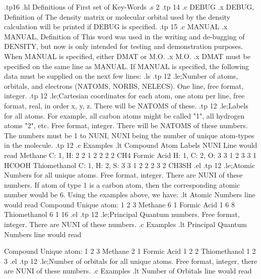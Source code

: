 .tp16
.hl Definitions of First set of Key-Words
.s 2
.tp 14
.c
DEBUG
.x DEBUG, Definition of
 The density matrix or molecular orbital used by the density calculation
will be printed if DEBUG is specified.
.tp 15
.c
 MANUAL
.x MANUAL, Definition of
 This word was used in the writing and de-bugging of DENSITY, 
but now is only intended for testing and demonstration purposes. 
  When MANUAL is specified, either DMAT or M.O.
.x M.O.
.x DMAT
must be specified on the same line as MANUAL.
 If MANUAL is specified, the following data must be supplied on the
next few lines:
.ls
.tp 12
.le;Number of atoms, orbitals, and electrons (NATOMS, NORBS, NELECS). 
One line, free format, integer.
.tp 12
.le;Cartesian coordinates for each atom, one atom per line, free format,
real, in order x, y, z. There will be NATOMS of these.
.tp 12
.le;Labels for all atoms. For example, all carbon atoms might be called
"1", all hydrogen atoms "2", etc. Free format, integer. There will be NATOMS
of these numbers. The numbers must be 1 to NUNI, NUNI being the number
of unique atom-types in the molecule. 
.tp 12
.c
 Examples
.lt
   Compound         Atom Labels        NUNI Line would read
  Methane         C: 1,   H: 2          2   1 2 2 2 2         CH4
  Formic Acid     H: 1,   C: 2,  O: 3   3   1 2 3 3 1         HCOOH
  Thiomethanol    C: 1,   H: 2,  S: 3   3   1 2 2 2 3 2       CH3SH
.el
.tp 12
.le;Atomic Numbers for all unique atoms. Free format, integer. There are
NUNI of these numbers. If atom of type 1 is a carbon atom, then the 
corresponding atomic number would be 6. Using the examples above, we have:
.lt
                  Atomic Numbers line would read
     Compound   Unique atom:  1  2  3
     Methane                  6  1
     Formic Acid              1  6  8
     Thiomethanol             6  1 16
.el
.tp 12
.le;Principal Quantum numbers. Free format, integer. There are
NUNI of these numbers.
.c
 Examples
.lt
               Principal Quantum Numbers line would read
               
     Compound   Unique atom:  1  2  3
     Methane                  2  1
     Formic Acid              1  2  2
     Thiomethanol             1  2  3
.el
.tp 12
.le;Number of orbitals for all unique atoms. Free format, integer, there are
NUNI of these numbers.
.c
 Examples
.lt
                Number of Orbitals line would read
                
